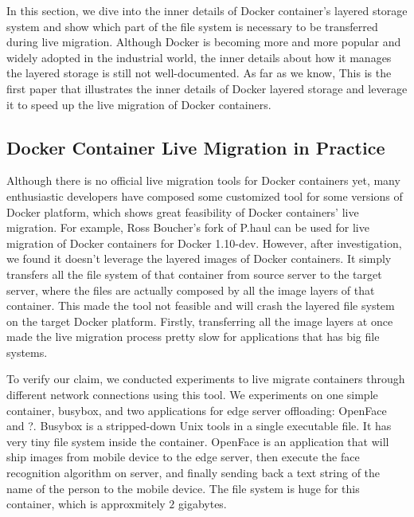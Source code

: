 
In this section, we dive into the inner details of Docker container's layered storage system and show which part of the file system is necessary to be transferred during live migration. 
Although Docker is becoming more and more popular and widely adopted in the industrial world, the inner details about how it manages the layered storage is still not well-documented. As far as we know, This is the first paper that illustrates the inner details of Docker layered storage and leverage it to speed up the live migration of Docker containers.






\subsection{Docker Container Live Migration in Practice }

Although there is no official live migration tools for Docker containers yet, many enthusiastic developers have composed some customized tool for some versions of Docker platform, which shows great feasibility of Docker containers' live migration. For example, Ross Boucher's fork \cite{boucherPhaul} of P.haul
can be used for live migration of Docker containers for Docker 1.10-dev. However, after investigation, we found it doesn't leverage the layered images of Docker containers. It simply transfers all the file system of that container from source server to the target server, where the files are actually composed by all the image layers of that container. This made the tool not feasible and will crash the layered file system on the target Docker platform. Firstly, transferring all the image layers at once made the live migration process pretty slow for applications that has big file systems. 

To verify our claim, we conducted experiments to live migrate containers through different network connections using this tool. We experiments on one simple container, busybox, and two applications for edge server offloading: OpenFace and ?.  Busybox is a stripped-down Unix tools in a single executable file. It has very tiny file system inside the container. OpenFace\cite{openface2016} is an application that will ship images from mobile device to the edge server, then execute the face recognition algorithm on server, and finally sending back a text string of the name of the person to the mobile device. The file system is huge for this container, which is approxmitely $2$ gigabytes.

